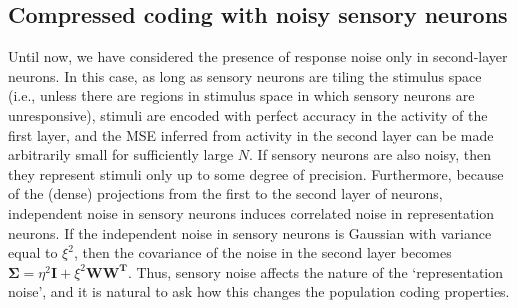 \documentclass[a4paper]{article}%
\begin{document}
\subsection*{Compressed coding with noisy sensory neurons}

\label{SuSe:In}

Until now, we have considered the presence of response noise only in
second-layer neurons. In this case, as long as sensory neurons are tiling the
stimulus space (i.e., unless there are regions in stimulus space in which
sensory neurons are unresponsive), stimuli are encoded with perfect accuracy
in the activity of the first layer, and the MSE inferred from activity in the
second layer can be made arbitrarily small for sufficiently large
\thinspace$N$. If sensory neurons are also noisy, then they represent stimuli
only up to some degree of precision. Furthermore, because of the (dense)
projections from the first to the second layer of neurons, independent noise
in sensory neurons induces correlated noise in representation neurons. If the
independent noise in sensory neurons is Gaussian with variance equal to
$\xi^{2}$, then the covariance of the noise in the second layer becomes
$\bm{\Sigma}=\eta^{2}\mathbf{I}+\xi^{2}\mathbf{WW^{T}}$. Thus, sensory noise
affects the nature of the `representation noise', and it is natural to ask how
this changes the population coding properties.
\end{document}
